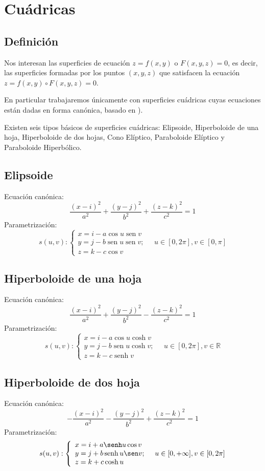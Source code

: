 \section{Cuádricas}
\subsection{Definición}

Nos interesan las superficies de ecuación $z=f(x, y)$ o $F(x, y, z)=0$, es decir, las superficies formadas por los puntos $(x, y, z)$ que satisfacen la ecuación $z=f(x, y) \circ F(x, y, z)=0$.

En particular trabajaremos únicamente con superficies cuádricas cuyas ecuaciones están dadas en forma canónica, basado en \cite{solis2016graficas}).

Existen seis tipos básicos de superficies cuádricas: Elipsoide, Hiperboloide de una hoja, Hiperboloide de dos hojas, Cono Elíptico, Paraboloide Elíptico y Paraboloide Hiperbólico.
\subsection{Elipsoide}
Ecuación canónica:
$$
\frac{(x-i)^{2}}{a^{2}}+\frac{(y-j)^{2}}{b^{2}}+\frac{(z-k)^{2}}{c^{2}}=1
$$
Parametrización:
$$
s(u, v):\left\{\begin{array}{l}
x=i-a \cos u \operatorname{sen} v \\
y=j-b \operatorname{sen} u \operatorname{sen} v ; \\
z=k-c \cos v
\end{array} \quad u \in[0,2 \pi], v \in[0, \pi]\right.
$$

\subsection{Hiperboloide de una hoja}
Ecuación canónica:
$$
\frac{(x-i)^{2}}{a^{2}}+\frac{(y-j)^{2}}{b^{2}}-\frac{(z-k)^{2}}{c^{2}}=1
$$
Parametrización:
$$
s(u, v):\left\{\begin{array}{l}
x=i-a \cos u \cosh v \\
y=j-b \operatorname{sen} u \cosh v ; \\
z=k-c \operatorname{senh} v
\end{array} \quad u \in[0,2 \pi], v \in \mathbb{R}\right.
$$

\subsection{Hiperboloide de dos hoja}
Ecuación canónica:
$$
-\frac{(x-i)^{2}}{a^{2}}-\frac{(y-j)^{2}}{b^{2}}+\frac{(z-k)^{2}}{c^{2}}=1
$$
Parametrización:
$$
s(u, v):\left\{\begin{array}{l}
x=i+a \senh u \cos v \\
y=j+b \operatorname{senh} u \sen v ; \\
z=k+c \operatorname{cosh} u
\end{array} \quad u \in[0, + \infty], v  \in[0,2 \pi] \right.
$$


